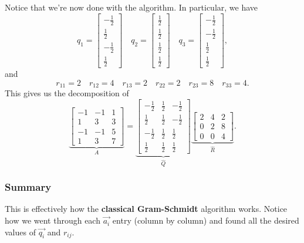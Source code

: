 \documentclass[letterpaper]{article}
\begin{document}
\begin{mdframed}
    Notice that we're now done with the algorithm. In particular, we have 
    \[q_1 = \begin{bmatrix}
        -\frac{1}{2} \\ \frac{1}{2} \\ -\frac{1}{2} \\ \frac{1}{2}
    \end{bmatrix} \quad q_2 = \begin{bmatrix}
        \frac{1}{2} \\ \frac{1}{2} \\ \frac{1}{2} \\ \frac{1}{2}
    \end{bmatrix} \quad q_3 = \begin{bmatrix}
        -\frac{1}{2} \\ -\frac{1}{2} \\ \frac{1}{2} \\ \frac{1}{2}
    \end{bmatrix},\]
    and 
    \[r_{11} = 2 \quad r_{12} = 4 \quad r_{13} = 2 \quad r_{22} = 2 \quad r_{23} = 8 \quad r_{33} = 4.\]
    This gives us the decomposition of 
    \[\underbrace{\begin{bmatrix}
        -1 & -1 & 1 \\ 
        1 & 3 & 3 \\ 
        -1 & -1 & 5 \\ 
        1 & 3 & 7
    \end{bmatrix}}_{A} = \underbrace{\begin{bmatrix}
        -\frac{1}{2} & \frac{1}{2} & -\frac{1}{2} \\ 
        \frac{1}{2} & \frac{1}{2} & -\frac{1}{2} \\ 
        -\frac{1}{2} & \frac{1}{2} & \frac{1}{2} \\ 
        \frac{1}{2} & \frac{1}{2} & \frac{1}{2}
    \end{bmatrix}}_{\hat{Q}} \underbrace{\begin{bmatrix}
        2 & 4 & 2 \\ 
        0 & 2 & 8 \\ 
        0 & 0 & 4
    \end{bmatrix}}_{\hat{R}}.\]
\end{mdframed}

\subsubsection{Summary}
This is effectively how the \textbf{classical Gram-Schmidt} algorithm works. Notice how we went through each $\vec{a_i}$ entry (column by column) and found all the desired values of $\vec{q_i}$ and $r_{ij}$. 
\end{document}
